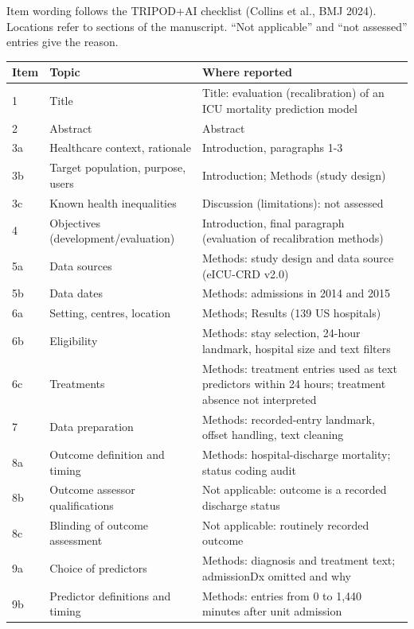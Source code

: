 \documentclass[10pt]{article}
\begin{document}
\par\smallskip
\noindent Item wording follows the TRIPOD+AI checklist (Collins et al., BMJ 2024). Locations refer to sections of the manuscript. ``Not applicable'' and ``not assessed'' entries give the reason.\par\medskip
\footnotesize
\begin{longtable}{@{}p{}p{}p{}@{}}
\toprule
Item & Topic & Where reported \\
\midrule\endhead
1 & Title & Title: evaluation (recalibration) of an ICU mortality prediction model \\
2 & Abstract & Abstract \\
3a & Healthcare context, rationale & Introduction, paragraphs 1-3 \\
3b & Target population, purpose, users & Introduction; Methods (study design) \\
3c & Known health inequalities & Discussion (limitations): not assessed \\
4 & Objectives (development/evaluation) & Introduction, final paragraph (evaluation of recalibration methods) \\
5a & Data sources & Methods: study design and data source (eICU-CRD v2.0) \\
5b & Data dates & Methods: admissions in 2014 and 2015 \\
6a & Setting, centres, location & Methods; Results (139 US hospitals) \\
6b & Eligibility & Methods: stay selection, 24-hour landmark, hospital size and text filters \\
6c & Treatments & Methods: treatment entries used as text predictors within 24 hours; treatment absence not interpreted \\
7 & Data preparation & Methods: recorded-entry landmark, offset handling, text cleaning \\
8a & Outcome definition and timing & Methods: hospital-discharge mortality; status coding audit \\
8b & Outcome assessor qualifications & Not applicable: outcome is a recorded discharge status \\
8c & Blinding of outcome assessment & Not applicable: routinely recorded outcome \\
9a & Choice of predictors & Methods: diagnosis and treatment text; admissionDx omitted and why \\
9b & Predictor definitions and timing & Methods: entries from 0 to 1,440 minutes after unit admission \\

\end{longtable}
\end{document}
